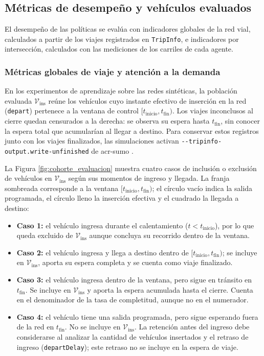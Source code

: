 \subsection{Métricas de desempeño y vehículos evaluados}
\label{sec:metricas_evidencia}

El desempeño de las políticas se evalúa con indicadores globales de la red vial, calculados a partir de los viajes registrados en \texttt{TripInfo}, e indicadores por intersección, calculados con las mediciones de los carriles de cada agente.

\subsubsection{Métricas globales de viaje y atención a la demanda}

En los experimentos de aprendizaje sobre las redes sintéticas, la población evaluada $\mathcal{V}_{\mathrm{ins}}$ reúne los vehículos cuyo instante efectivo de inserción en la red (\texttt{depart}) pertenece a la ventana de control $[t_{\mathrm{inicio}},t_{\mathrm{fin}})$. Los viajes inconclusos al cierre quedan censurados a la derecha: se observa su espera hasta $t_{\mathrm{fin}}$, sin conocer la espera total que acumularían al llegar a destino. Para conservar estos registros junto con los viajes finalizados, las simulaciones activan \texttt{{-}{-}tripinfo-\allowbreak output.\allowbreak write-\allowbreak unfinished} de \acrshort{acr-sumo} \cite{SUMO2026_TripInfo}.

La Figura \ref{fig:cohorte_evaluacion} muestra cuatro casos de inclusión o exclusión de vehículos en $\mathcal{V}_{\mathrm{ins}}$ según sus momentos de ingreso y llegada. La franja sombreada corresponde a la ventana $[t_{\mathrm{inicio}},t_{\mathrm{fin}})$; el círculo vacío indica la salida programada, el círculo lleno la inserción efectiva y el cuadrado la llegada a destino:
\begin{itemize}
    \item \textbf{Caso 1:} el vehículo ingresa durante el calentamiento ($t < t_{\mathrm{inicio}}$), por lo que queda excluido de $\mathcal{V}_{\mathrm{ins}}$ aunque concluya su recorrido dentro de la ventana.
    \item \textbf{Caso 2:} el vehículo ingresa y llega a destino dentro de $[t_{\mathrm{inicio}},t_{\mathrm{fin}})$; se incluye en $\mathcal{V}_{\mathrm{ins}}$, aporta su espera completa y se cuenta como viaje finalizado.
    \item \textbf{Caso 3:} el vehículo ingresa dentro de la ventana, pero sigue en tránsito en $t_{\mathrm{fin}}$. Se incluye en $\mathcal{V}_{\mathrm{ins}}$ y aporta la espera acumulada hasta el cierre. Cuenta en el denominador de la tasa de completitud, aunque no en el numerador.
    \item \textbf{Caso 4:} el vehículo tiene una salida programada, pero sigue esperando fuera de la red en $t_{\mathrm{fin}}$. No se incluye en $\mathcal{V}_{\mathrm{ins}}$. La retención antes del ingreso debe considerarse al analizar la cantidad de vehículos insertados y el retraso de ingreso (\texttt{departDelay}); este retraso no se incluye en la espera de viaje.
\end{itemize}

